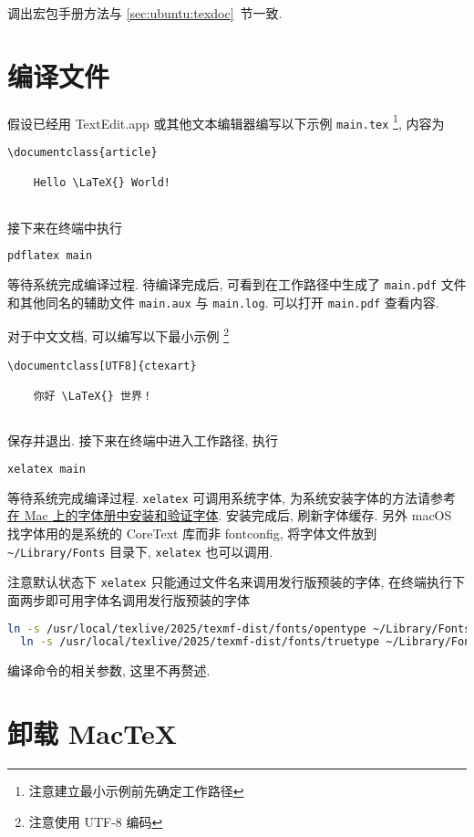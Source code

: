 调出宏包手册方法与 \ref{sec:ubuntu:texdoc}~节一致.

\section{编译文件}

假设已经用 TextEdit.app 或其他文本编辑器编写以下示例 \texttt{main.tex}%
\footnote{注意建立最小示例前先确定工作路径},
内容为
\begin{lstlisting}[language = {[LaTeX]TeX}]
  \documentclass{article}
  
    Hello \LaTeX{} World!
  
\end{lstlisting}
接下来在\textsf{终端}中执行
\begin{lstlisting}[language=bash]
  pdflatex main
\end{lstlisting}
等待系统完成编译过程. 
待编译完成后, 可看到在工作路径中生成了 \texttt{main.pdf}
文件和其他同名的辅助文件 \texttt{main.aux} 与 \texttt{main.log}.
可以打开 \texttt{main.pdf} 查看内容.

对于中文文档, 可以编写以下最小示例%
\footnote{注意使用 UTF-8 编码}%
\begin{lstlisting}[language={[LaTeX]TeX}]
  \documentclass[UTF8]{ctexart}
  
    你好 \LaTeX{} 世界！
  
\end{lstlisting}
保存并退出.
接下来在\textsf{终端}中进入工作路径,
执行
\begin{lstlisting}[language=bash]
  xelatex main
\end{lstlisting}
等待系统完成编译过程.
\texttt{xelatex} 可调用系统字体,
为系统安装字体的方法请参考%
\href{https://support.apple.com/zh-cn/guide/font-book/fntbk1000/mac}{在 Mac 上的字体册中安装和验证字体}.
安装完成后, 刷新字体缓存.
另外 macOS 找字体用的是系统的 CoreText 库而非 fontconfig,
将字体文件放到 \verb+~/Library/Fonts+ 目录下,
\texttt{xelatex} 也可以调用.

注意默认状态下 \texttt{xelatex} 只能通过文件名来调用发行版预装的字体,
在\textsf{终端}执行下面两步即可用字体名调用发行版预装的字体
\begin{lstlisting}[language=bash]
  ln -s /usr/local/texlive/2025/texmf-dist/fonts/opentype ~/Library/Fonts/
  ln -s /usr/local/texlive/2025/texmf-dist/fonts/truetype ~/Library/Fonts/
\end{lstlisting}

编译命令的相关参数, 这里不再赘述.

\section{卸载 Mac\TeX}

